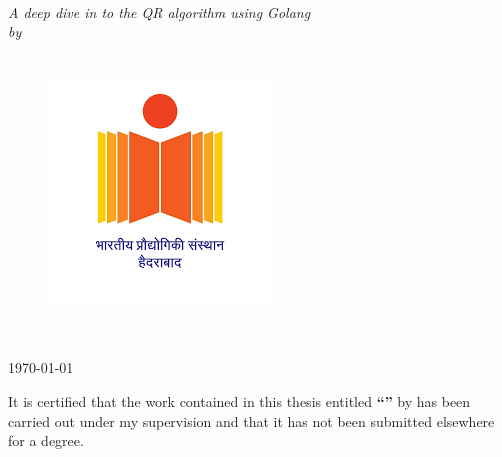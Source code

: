 \documentclass[11pt, a4paper, oneside]{Thesis} %
\begin{document}
\begin{titlepage}
\begin{center}

\HRule \\[0.4cm] %
{\huge \bfseries \ttitle}\\[0.4cm] %
\HRule \\[1.5cm] %
 
\large \textit{A deep dive in to the QR algorithm using Golang}\\[0.3cm] %
\textit{by}\\[0.4cm]
\authornames \\



\vfill
\graphicspath{ {./Figures/} }
\begin{figure}[hb]
  \centering
  \includegraphics[width=0.35\linewidth]{Pictures/IITHLOGO.png}
\end{figure}

\DEPTNAME\\ %
\textsc{ \UNIVNAME}\\[1.5cm] %
\large \today\\[2cm] %


\end{center}

\end{titlepage}


\setcounter{page}{2}

\begin{minipage}{\textwidth}
    
    It is certified that the work contained in this thesis entitled \textbf{\enquote{\ttitle}} by \textbf{\authornames} has been carried out under my supervision and that it has not been submitted elsewhere for a degree.
        
\end{minipage}
\end{document}
